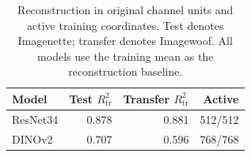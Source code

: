 \begin{table}[tbp]
    \centering
    \begin{tabular}{lrrr}
        \toprule
        Model    & Test $R^{2}_{\mathrm{tr}}$ & Transfer $R^{2}_{\mathrm{tr}}$
        & Active  \\
        \midrule
        ResNet34 & 0.878                      & 0.881
        & 512/512 \\
        DINOv2   & 0.707                      & 0.596
        & 768/768 \\
        \bottomrule
    \end{tabular}
    \caption{Reconstruction in original channel units and active training
        coordinates. Test denotes Imagenette; transfer denotes Imagewoof. All
        models
        use the training mean as the reconstruction baseline.}
    \label{tab:imagenette-metrics}
\end{table}
